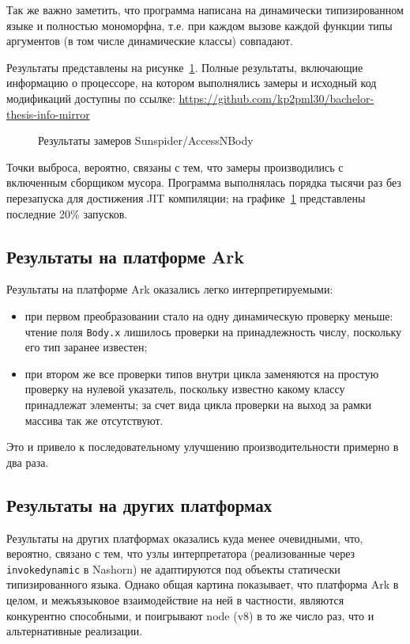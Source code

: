 \documentclass[times
]{itmo-student-thesis}
\begin{document}
Так же важно заметить, что программа написана на динамически типизированном языке и полностью мономорфна, т.е. при каждом вызове каждой функции типы аргументов (в том числе динамические классы) совпадают.

Результаты представлены на рисунке~\ref{fig:accessnbodyres}. Полные результаты, включающие информацию о процессоре, на котором выполнялись замеры и исходный код модификаций доступны по ссылке: \url{https://github.com/kp2pml30/bachelor-thesis-info-mirror}
\begin{figure}[!h]
	\caption{Результаты замеров Sunspider/AccessNBody}\label{fig:accessnbodyres}
	\resizebox{\textwidth}{!}{}
\end{figure}

Точки выброса, вероятно, связаны с тем, что замеры производились с включенным сборщиком мусора. Программа выполнялась порядка тысячи раз без перезапуска для достижения JIT компиляции; на графике~\ref{fig:accessnbodyres} представлены последние 20\% запусков.

\subsection{Результаты на платформе Ark}
Результаты на платформе Ark оказались легко интерпретируемыми:
\begin{itemize}
\item при первом преобразовании стало на одну динамическую проверку меньше: чтение поля \texttt{Body.x} лишилось проверки на принадлежность числу, поскольку его тип заранее известен;
\item при втором же все проверки типов внутри цикла заменяются на простую проверку на нулевой указатель, поскольку известно какому классу принадлежат элементы; за счет вида цикла проверки на выход за рамки массива так же отсутствуют.
\end{itemize}

Это и привело к последовательному улучшению производительности примерно в два раза.

\subsection{Результаты на других платформах}
Результаты на других платформах оказались куда менее очевидными, что, вероятно, связано с тем, что узлы интерпретатора (реализованные через \texttt{invokedynamic} в Nashorn) не адаптируются под объекты статически типизированного языка. Однако общая картина показывает, что платформа Ark в целом, и межъязыковое взаимодействие на ней в частности, являются конкурентно способными, и поигрывают node (v8) в то же число раз, что и альтернативные реализации.
\end{document}
